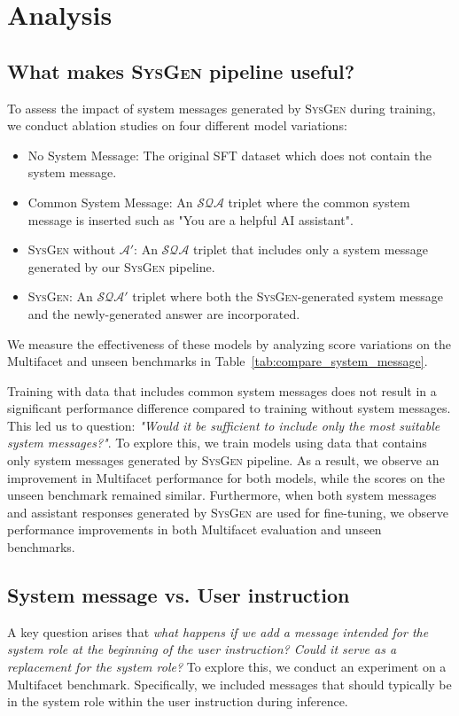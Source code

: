 
\section{Analysis}
\subsection{What makes \textsc{SysGen} pipeline useful?}
\label{ana:sysgen_useful}

To assess the impact of system messages generated by \textsc{SysGen} during training, we conduct ablation studies on four different model variations:
\begin{itemize}
    \item No System Message: The original SFT dataset which does not contain the system message. 
    \item Common System Message: An $\mathcal{S}\mathcal{Q}\mathcal{A}$ triplet where the common system message is inserted such as "You are a helpful AI assistant".
    \item \textsc{SysGen} without $\mathcal{A'}$: An $\mathcal{S}\mathcal{Q}\mathcal{A}$ triplet that includes only a system message generated by our \textsc{SysGen} pipeline.
    \item \textsc{SysGen}: An $\mathcal{S}\mathcal{Q}\mathcal{A'}$ triplet where both the \textsc{SysGen}-generated system message and the newly-generated answer are incorporated.
\end{itemize}
We measure the effectiveness of these models by analyzing score variations on the Multifacet and unseen benchmarks in Table~\ref{tab:compare_system_message}.

Training with data that includes common system messages does not result in a significant performance difference compared to training without system messages.
This led us to question: \emph{"Would it be sufficient to include only the most suitable system messages?"}.
To explore this, we train models using data that contains only system messages generated by \textsc{SysGen} pipeline.
As a result, we observe an improvement in Multifacet performance for both models, while the scores on the unseen benchmark remained similar.
Furthermore, when both system messages and assistant responses generated by \textsc{SysGen} are used for fine-tuning, we observe performance improvements in both Multifacet evaluation and unseen benchmarks.

\subsection{System message vs. User instruction}

A key question arises that \emph{what happens if we add a message intended for the system role at the beginning of the user instruction? Could it serve as a replacement for the system role?}
To explore this, we conduct an experiment on a Multifacet benchmark.
Specifically, we included messages that should typically be in the system role within the user instruction during inference.

